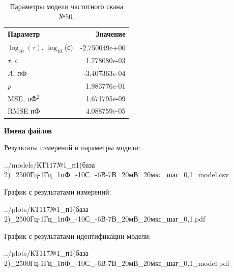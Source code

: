 \begin{table}[!ht]
    \centering
    \caption{Параметры модели частотного скана №50.}
    \begin{tabular}{|l|r|}
        \hline
        Параметр                                       & Значение                  \\ \hline
        $\log_{10}(\tau)$, $\log_{10}$(с)              & -2.750049e+00             \\ \hline
        $\tau$, с                                      & 1.778080e-03              \\ \hline
        $A$, пФ                                        & -3.407363e-04             \\ \hline
        $p$                                            & 1.983776e-01              \\ \hline
        MSE, пФ$^2$                                    & 1.671795e-09              \\ \hline
        RMSE пФ                                        & 4.088759e-05              \\ \hline
    \end{tabular}
    \label{table:frequency_scan_model_50}
\end{table}

\textbf{Имена файлов}

Результаты измерений и параметры модели:

\scriptsize../models/КТ117№1\_п1(база 2)\_2500Гц-1Гц\_1пФ\_-10С\_-6В-7В\_20мВ\_20мкс\_шаг\_0,1\_model.csv
\normalsize

График с результатами измерений:

\scriptsize../plots/КТ117№1\_п1(база 2)\_2500Гц-1Гц\_1пФ\_-10С\_-6В-7В\_20мВ\_20мкс\_шаг\_0,1.pdf
\normalsize

График с результатами идентификации модели:

\scriptsize../plots/КТ117№1\_п1(база 2)\_2500Гц-1Гц\_1пФ\_-10С\_-6В-7В\_20мВ\_20мкс\_шаг\_0,1\_model.pdf
\normalsize


